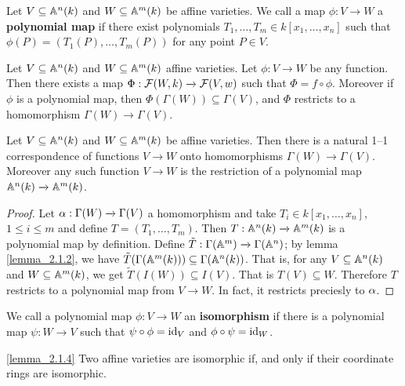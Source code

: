 \begin{definition}
  Let $V \subseteq \mathbb{A}^n(k)$ and $W \subseteq \mathbb{A}^m(k)$ be affine varieties. We
  call a map $\phi:V \xrightarrow{} W$ a \textbf{polynomial map} if there exist
  polynomials $T_1, \dots, T_m \in k[x_1, \dots, x_n]$ such that
  $\phi(P)=(T_1(P), \dots, T_m(P))$ for any point $P \in V$.
\end{definition}

\begin{lemma}\label{lemma_2.1.2}
  Let $V \subseteq \mathbb{A}^n(k)$ and $W \subseteq \mathbb{A}^m(k)$ affine varieties. Let
  $\phi:V \xrightarrow{} W$ be any function. Then there exists a map
  $\Phi:\mathcal{F}(W,k) \xrightarrow{} \mathcal{F}(V,w)$ such that $\Phi=f \circ \phi$.
  Moreover if $\phi$ is a polynomial map, then $\Phi(\Gamma(W)) \subseteq
  \Gamma(V)$, and $\Phi$ restricts to a homomorphism  $\Gamma(W) \xrightarrow{}
  \Gamma(V)$.
\end{lemma}

\begin{theorem}\label{theorem_2.1.3}
  Let $V \subseteq \mathbb{A}^n(k)$ and $W \subseteq \mathbb{A}^m(k)$ be affine varieties. Then
  there is a natural 1--1 correspondence of functions $V
  \xrightarrow{} W$ onto homomorphisms $\Gamma(W) \xrightarrow{} \Gamma(V)$.
  Moreover any such function $V \xrightarrow{} W$ is the restriction of a
  polynomial map $\mathbb{A}^n(k) \xrightarrow{} \mathbb{A}^m(k)$.
\end{theorem}
\begin{proof}
  Let $\alpha:\Gamma(W) \xrightarrow{} \Gamma(V)$ a homomorphism and take $T_i \in
  k[x_1, \dots, x_n]$, $1 \leq i \leq m$ and define $T=(T_1, \dots, T_m)$. Then
  $T:\mathbb{A}^n(k) \xrightarrow{} \mathbb{A}^m(k)$ is a polynomial map by definition. Define
  $\tilde{T}:\Gamma(\mathbb{A}^m) \xrightarrow{} \Gamma(\mathbb{A}^n)$; by lemma
  \ref{lemma_2.1.2}, we have $\tilde{T}(\Gamma(\mathbb{A}^m(k))) \subseteq
  \Gamma(\mathbb{A}^n(k))$. That is, for any $V \subseteq \mathbb{A}^n(k)$ and $W \subseteq
  \mathbb{A}^m(k)$, we get $\tilde{T}(I(W)) \subseteq I(V)$. That is $T(V) \subseteq W$.
  Therefore $T$ restricts to a polynomial map from  $V \xrightarrow{} W$. In
  fact, it restricts preciesly to $\alpha$.
\end{proof}

\begin{definition}
  We call a polynomial map $\phi:V \xrightarrow{} W$ an \textbf{isomorphism} if
  there is a polynomial map $\psi:W \xrightarrow{} V$ such that $\psi \circ
  \phi=\operatorname{id}_V$ and  $\phi \circ \psi=\operatorname{id}_W$.
\end{definition}

\begin{lemma}\ref{lemma_2.1.4}
  Two affine varieties are isomorphic if, and only if their coordinate rings are
  isomorphic.
\end{lemma}
